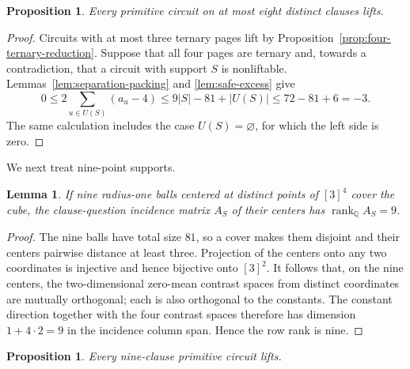 \documentclass[11pt]{article}
\newtheorem{proposition}[theorem]{Proposition}
\newtheorem{lemma}[theorem]{Lemma}
\theoremstyle{definition}
\theoremstyle{remark}
\newcommand{\Q}{\mathbb{Q}}
\newcommand{\rank}{\operatorname{rank}}
\newcommand{\card}[1]{\lvert #1\rvert}
\numberwithin{equation}{section}
\begin{document}
\begin{proposition}\label{prop:subnine}
Every primitive circuit on at most eight distinct clauses lifts.
\end{proposition}

\begin{proof}
Circuits with at most three ternary pages lift by
Proposition~\ref{prop:four-ternary-reduction}.  Suppose that all four pages are
ternary and, towards a contradiction, that a circuit with support \(S\) is
nonliftable.  Lemmas~\ref{lem:separation-packing} and
\ref{lem:safe-excess} give
\[
  0
  \leq
  2\sum_{u\in U(S)}(a_u-4)
  \leq
  9\card S-81+\card{U(S)}
  \leq72-81+6=-3.
\]
The same calculation includes the case \(U(S)=\varnothing\), for which the
left side is zero.
\end{proof}

We next treat nine-point supports.

\begin{lemma}\label{lem:nine-independence}
If nine radius-one balls centered at distinct points of \([3]^4\) cover the
cube, the clause-question incidence matrix \(A_S\) of their centers has
\(\rank_{\Q}A_S=9\).
\end{lemma}

\begin{proof}
The nine balls have total size \(81\), so a cover makes them disjoint and
their centers pairwise distance at least three.  Projection of the centers
onto any two coordinates is injective and hence bijective onto \([3]^2\).
It follows that, on the nine centers, the two-dimensional zero-mean contrast
spaces from distinct coordinates are mutually orthogonal; each is also
orthogonal to the constants.  The constant direction together with the four
contrast spaces therefore has dimension \(1+4\cdot2=9\) in the incidence
column span.  Hence the row rank is nine.
\end{proof}

\begin{proposition}\label{prop:nine}
Every nine-clause primitive circuit lifts.
\end{proposition}
\end{document}
